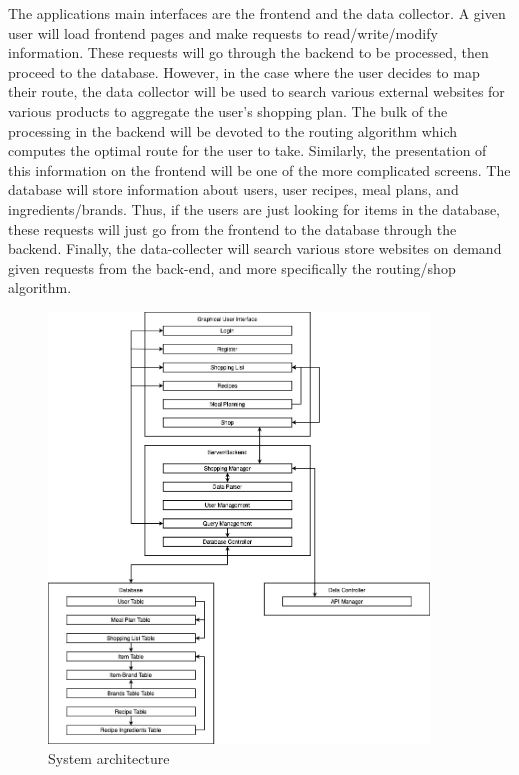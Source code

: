 The applications main interfaces are the frontend and the data collector.  A given user will load frontend pages and make requests to read/write/modify information.  These requests will go through the backend to be processed, then proceed to the database.  However, in the case where the user decides to map their route, the data collector will be used to search various external websites for various products to aggregate the user's shopping plan.  The bulk of the processing in the backend will be devoted to the routing algorithm which computes the optimal route for the user to take.  Similarly, the presentation of this information on the frontend will be one of the more complicated screens.  The database will store information about users, user recipes, meal plans, and ingredients/brands.  Thus, if the users are just looking for items in the database, these requests will just go from the frontend to the database through the backend.  Finally, the data-collecter will search various store websites on demand given requests from the back-end, and more specifically the routing/shop algorithm.
\begin{figure}[h!]
	\centering
 	\includegraphics[width=0.90\textwidth]{images/flowChart}
 \caption{System architecture}
\end{figure}
